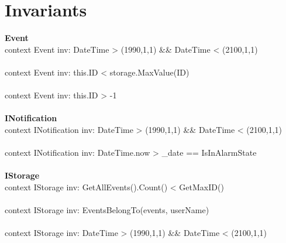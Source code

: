 \section{Invariants}

\textbf{Event\\}
context Event inv:
DateTime > (1990,1,1) \&\& DateTime < (2100,1,1)\\\\
context Event inv:
this.ID < storage.MaxValue(ID)\\\\
context Event inv:
this.ID > -1\\\\
\textbf{INotification\\}
context INotification inv:
DateTime > (1990,1,1) \&\& DateTime < (2100,1,1)\\\\
context INotification inv:
DateTime.now > _date == IsInAlarmState\\\\
\textbf{IStorage\\}
context IStorage inv:
GetAllEvents().Count() < GetMaxID()\\\\
context IStorage inv:
EventsBelongTo(events, userName)\\\\
context IStorage inv:
DateTime > (1990,1,1) \&\& DateTime < (2100,1,1)